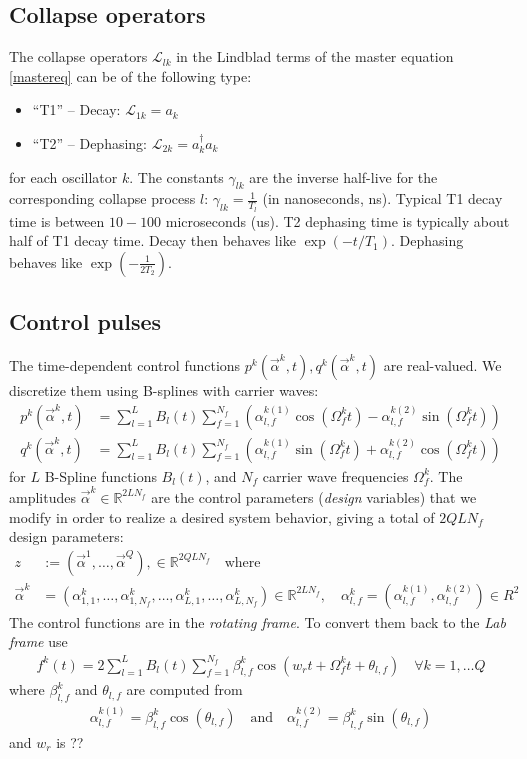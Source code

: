 \documentclass[letterpaper]{article}
\newcommand{\Ell}{\mathcal{L}}
\newcommand{\R}{\mathds{R}}
\begin{document}
\subsection{Collapse operators}
The collapse operators $\Ell_{lk}$ in the Lindblad terms of the master equation \eqref{mastereq} can be of the following type:
\begin{itemize}
  \item ``T1'' -- Decay: $\Ell_{1k} = a_k$
  \item ``T2'' -- Dephasing: $\Ell_{2k} = a_k^{\dagger}a_k$
\end{itemize}
for each oscillator $k$. The constants $\gamma_{lk}$ are the inverse half-live for the corresponding collapse process $l$: $\gamma_{lk} = {\frac{1}{T_l}}$ (in nanoseconds, ns). Typical T1 decay time is between $10-100$ microseconds (us). T2 dephasing time is typically about half of T1 decay time. Decay then behaves like $\exp(-t/{T_1})$. Dephasing behaves like $\exp(-\frac{1}{2{T_2}})$.

\subsection{Control pulses}
The time-dependent control functions $p^k(\vec{\alpha}^k,t), q^k(\vec{\alpha}^k,t)$ are real-valued. We discretize them using B-splines with carrier waves:
\begin{align}
  p^k(\vec{\alpha}^k,t) &= \sum_{l=1}^L B_l(t) \sum_{f=1}^{N_f} \left(\alpha^{k (1)}_{l,f} \cos(\Omega_f^k t) - \alpha^{k (2)}_{l,f} \sin(\Omega_f^k t) \right) \\
  q^k(\vec{\alpha}^k,t) &= \sum_{l=1}^L B_l(t) \sum_{f=1}^{N_f} \left( \alpha^{k (1)}_{l,f} \sin(\Omega_f^k t) + \alpha^{k (2)}_{l,f} \cos(\Omega_f^k t) \right)
\end{align}
for $L$ B-Spline functions $B_l(t)$, and $N_f$ carrier wave frequencies $\Omega_f^k$. The amplitudes $\vec{\alpha}^k \in \R^{2LN_f}$ are the control parameters (\textit{design} variables) that we modify in order to realize a desired system behavior, giving a total of $2QLN_f$ design parameters:
\begin{align}
  z &:= \left( \vec{\alpha}^1, \dots, \vec{\alpha}^Q \right), \in \mathds{R}^{2QLN_f} \quad \text{where}\\
  \vec{\alpha}^k &= \left( \alpha_{1,1}^k,\dots, \alpha_{1,N_f}^k, \dots, \alpha_{L,1}^{k}, \dots, \alpha_{L,N_f}^k \right) \in \R^{2LN_f}, \quad \alpha_{l,f}^k = \left(\alpha_{l,f}^{k(1)}, \alpha_{l,f}^{k(2)} \right) \in R^2
\end{align}
The control functions are in the \textit{rotating frame}. To convert them back to the \textit{Lab frame} use
\begin{align}
  f^k(t) = 2 \sum_{l=1}^L B_l(t) \sum_{f=1}^{N_f} \beta_{l,f}^k \cos(w_r t + \Omega_f^k t + \theta_{l,f}) \quad \forall k=1,\dots Q
\end{align}
where $\beta_{l,f}^k$ and $\theta_{l,f}$ are computed from
\begin{align}
  \alpha_{l,f}^{k(1)} = \beta_{l,f}^k \cos(\theta_{l,f}) \quad \text{and} \quad \alpha_{l,f}^{k(2)} = \beta_{l,f}^k \sin(\theta_{l,f})
\end{align}
and $w_r$ is ??
\end{document}
